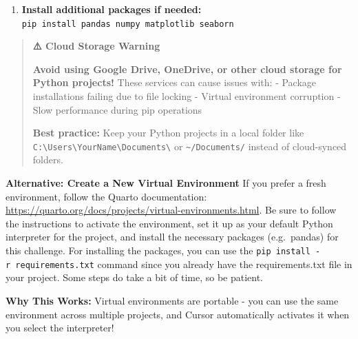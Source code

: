 \documentclass[
]{article}
\providecommand{\tightlist}{%
  \setlength{\itemsep}{0pt}\setlength{\parskip}{0pt}}
\begin{document}
\begin{tcolorbox}
\begin{enumerate}
\begin{itemize}
    \begin{itemize}
    \tightlist
    \item
      \textbf{Windows Command Prompt:}
      \texttt{venv\textbackslash{}Scripts\textbackslash{}activate}
    \item
      \textbf{Windows PowerShell:}
      \texttt{.\textbackslash{}venv\textbackslash{}Scripts\textbackslash{}Activate.ps1}
    \item
      \textbf{Mac/Linux:} \texttt{source\ venv/bin/activate}
    \end{itemize}
  \item
    You should see \texttt{(venv)} at the beginning of your terminal
    prompt
  \end{itemize}
\item
  \textbf{Install additional packages if needed:}
  \texttt{pip\ install\ pandas\ numpy\ matplotlib\ seaborn}
\end{enumerate}

\begin{quote}
\textbf{⚠️ Cloud Storage Warning}

\textbf{Avoid using Google Drive, OneDrive, or other cloud storage for
Python projects!} These services can cause issues with: - Package
installations failing due to file locking - Virtual environment
corruption - Slow performance during pip operations

\textbf{Best practice:} Keep your Python projects in a local folder like
\texttt{C:\textbackslash{}Users\textbackslash{}YourName\textbackslash{}Documents\textbackslash{}}
or \texttt{\textasciitilde{}/Documents/} instead of cloud-synced
folders.
\end{quote}

\textbf{Alternative: Create a New Virtual Environment} If you prefer a
fresh environment, follow the Quarto documentation:
\url{https://quarto.org/docs/projects/virtual-environments.html}. Be
sure to follow the instructions to activate the environment, set it up
as your default Python interpreter for the project, and install the
necessary packages (e.g.~pandas) for this challenge. For installing the
packages, you can use the \texttt{pip\ install\ -r\ requirements.txt}
command since you already have the requirements.txt file in your
project. Some steps do take a bit of time, so be patient.

\textbf{Why This Works:} Virtual environments are portable - you can use
the same environment across multiple projects, and Cursor automatically
activates it when you select the interpreter!

\end{tcolorbox}
\end{document}
